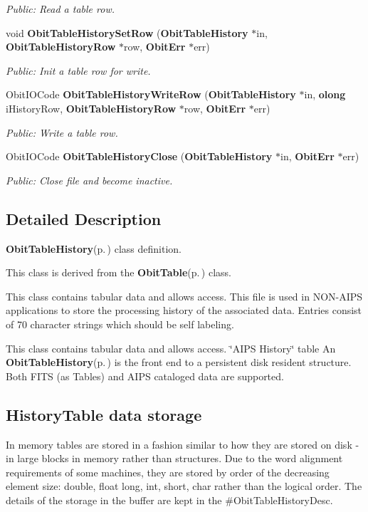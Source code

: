 \begin{CompactItemize}
\begin{CompactList}\small\item\em Public: Read a table row. \item\end{CompactList}\item 
void {\bf Obit\-Table\-History\-Set\-Row} ({\bf Obit\-Table\-History} $\ast$in, {\bf Obit\-Table\-History\-Row} $\ast$row, {\bf Obit\-Err} $\ast$err)
\begin{CompactList}\small\item\em Public: Init a table row for write. \item\end{CompactList}\item 
Obit\-IOCode {\bf Obit\-Table\-History\-Write\-Row} ({\bf Obit\-Table\-History} $\ast$in, {\bf olong} i\-History\-Row, {\bf Obit\-Table\-History\-Row} $\ast$row, {\bf Obit\-Err} $\ast$err)
\begin{CompactList}\small\item\em Public: Write a table row. \item\end{CompactList}\item 
Obit\-IOCode {\bf Obit\-Table\-History\-Close} ({\bf Obit\-Table\-History} $\ast$in, {\bf Obit\-Err} $\ast$err)
\begin{CompactList}\small\item\em Public: Close file and become inactive. \item\end{CompactList}\end{CompactItemize}


\subsection{Detailed Description}
{\bf Obit\-Table\-History}{\rm (p.\,\pageref{structObitTableHistory})} class definition. 

This class is derived from the {\bf Obit\-Table}{\rm (p.\,\pageref{structObitTable})} class.

This class contains tabular data and allows access. This file is used in NON-AIPS applications to store the processing history of the associated data. Entries consist of 70 character strings which should be self labeling.

This class contains tabular data and allows access. \char`\"{}AIPS History\char`\"{} table An {\bf Obit\-Table\-History}{\rm (p.\,\pageref{structObitTableHistory})} is the front end to a persistent disk resident structure. Both FITS (as Tables) and AIPS cataloged data are supported.\subsection{History\-Table data storage}\label{ObitTableWX_8h_TableDataStorage}
In memory tables are stored in a fashion similar to how they are stored on disk - in large blocks in memory rather than structures. Due to the word alignment requirements of some machines, they are stored by order of the decreasing element size: double, float long, int, short, char rather than the logical order. The details of the storage in the buffer are kept in the \#Obit\-Table\-History\-Desc.

